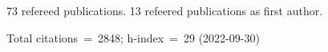 73 refereed publications. 13 refeered publications as first author.

Total citations~=~2848; h-index~=~29 (2022-09-30)